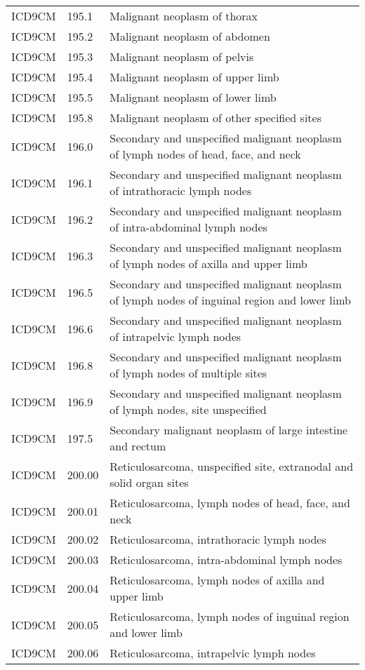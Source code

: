 \begin{longtable}{p{}p{}p{}}
  ICD9CM & 195.1 & Malignant neoplasm of thorax \\ 
  ICD9CM & 195.2 & Malignant neoplasm of abdomen \\ 
  ICD9CM & 195.3 & Malignant neoplasm of pelvis \\ 
  ICD9CM & 195.4 & Malignant neoplasm of upper limb \\ 
  ICD9CM & 195.5 & Malignant neoplasm of lower limb \\ 
  ICD9CM & 195.8 & Malignant neoplasm of other specified sites \\ 
  ICD9CM & 196.0 & Secondary and unspecified malignant neoplasm of lymph nodes of head, face, and neck \\ 
  ICD9CM & 196.1 & Secondary and unspecified malignant neoplasm of intrathoracic lymph nodes \\ 
  ICD9CM & 196.2 & Secondary and unspecified malignant neoplasm of intra-abdominal lymph nodes \\ 
  ICD9CM & 196.3 & Secondary and unspecified malignant neoplasm of lymph nodes of axilla and upper limb \\ 
  ICD9CM & 196.5 & Secondary and unspecified malignant neoplasm of lymph nodes of inguinal region and lower limb \\ 
  ICD9CM & 196.6 & Secondary and unspecified malignant neoplasm of intrapelvic lymph nodes \\ 
  ICD9CM & 196.8 & Secondary and unspecified malignant neoplasm of lymph nodes of multiple sites \\ 
  ICD9CM & 196.9 & Secondary and unspecified malignant neoplasm of lymph nodes, site unspecified \\ 
  ICD9CM & 197.5 & Secondary malignant neoplasm of large intestine and rectum \\ 
  ICD9CM & 200.00 & Reticulosarcoma, unspecified site, extranodal and solid organ sites \\ 
  ICD9CM & 200.01 & Reticulosarcoma, lymph nodes of head, face, and neck \\ 
  ICD9CM & 200.02 & Reticulosarcoma, intrathoracic lymph nodes \\ 
  ICD9CM & 200.03 & Reticulosarcoma, intra-abdominal lymph nodes \\ 
  ICD9CM & 200.04 & Reticulosarcoma, lymph nodes of axilla and upper limb \\ 
  ICD9CM & 200.05 & Reticulosarcoma, lymph nodes of inguinal region and lower limb \\ 
  ICD9CM & 200.06 & Reticulosarcoma, intrapelvic lymph nodes \\ 

\end{longtable}
